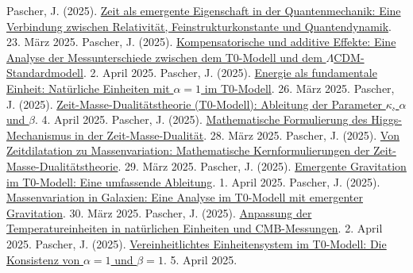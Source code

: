 \documentclass[12pt,a4paper]{article}
\begin{document}
\begin{thebibliography}{99}
	 Pascher, J. (2025). \href{https://github.com/jpascher/T0-Time-Mass-Duality/tree/main/2/pdf/Deutsch/ZeitEmergentQM.pdf}{Zeit als emergente Eigenschaft in der Quantenmechanik: Eine Verbindung zwischen Relativität, Feinstrukturkonstante und Quantendynamik}. 23. März 2025.
	 Pascher, J. (2025). \href{https://github.com/jpascher/T0-Time-Mass-Duality/tree/main/2/pdf/Deutsch/MessdifferenzenT0Standard.pdf}{Kompensatorische und additive Effekte: Eine Analyse der Messunterschiede zwischen dem T0-Modell und dem \(\Lambda\)CDM-Standardmodell}. 2. April 2025.
	 Pascher, J. (2025). \href{https://github.com/jpascher/T0-Time-Mass-Duality/tree/main/2/pdf/Deutsch/NatEinheitenAlpha1.pdf}{Energie als fundamentale Einheit: Natürliche Einheiten mit \(\alpha = 1\) im T0-Modell}. 26. März 2025.
	 Pascher, J. (2025). \href{https://github.com/jpascher/T0-Time-Mass-Duality/tree/main/2/pdf/Deutsch/ZeitMasseT0Params.pdf}{Zeit-Masse-Dualitätstheorie (T0-Modell): Ableitung der Parameter \(\kappa\), \(\alpha\) und \(\beta\)}. 4. April 2025.
	 Pascher, J. (2025). \href{https://github.com/jpascher/T0-Time-Mass-Duality/tree/main/2/pdf/Deutsch/MathHiggsZeitMasse.pdf}{Mathematische Formulierung des Higgs-Mechanismus in der Zeit-Masse-Dualität}. 28. März 2025.
	 Pascher, J. (2025). \href{https://github.com/jpascher/T0-Time-Mass-Duality/tree/main/2/pdf/Deutsch/MathZeitMasseLagrange.pdf}{Von Zeitdilatation zu Massenvariation: Mathematische Kernformulierungen der Zeit-Masse-Dualitätstheorie}. 29. März 2025.
	 Pascher, J. (2025). \href{https://github.com/jpascher/T0-Time-Mass-Duality/tree/main/2/pdf/Deutsch/EmergentGravT0.pdf}{Emergente Gravitation im T0-Modell: Eine umfassende Ableitung}. 1. April 2025.
	 Pascher, J. (2025). \href{https://github.com/jpascher/T0-Time-Mass-Duality/tree/main/2/pdf/Deutsch/MassVarGalaxien.pdf}{Massenvariation in Galaxien: Eine Analyse im T0-Modell mit emergenter Gravitation}. 30. März 2025.
	 Pascher, J. (2025). \href{https://github.com/jpascher/T0-Time-Mass-Duality/tree/main/2/pdf/Deutsch/TempEinheitenCMB.pdf}{Anpassung der Temperatureinheiten in natürlichen Einheiten und CMB-Messungen}. 2. April 2025.
	 Pascher, J. (2025). \href{https://github.com/jpascher/T0-Time-Mass-Duality/tree/main/2/pdf/Deutsch/Alpha1Beta1Konsistenz.pdf}{Vereinheitlichtes Einheitensystem im T0-Modell: Die Konsistenz von \(\alpha = 1\) und \(\beta = 1\)}. 5. April 2025.

\end{thebibliography}
\end{document}
